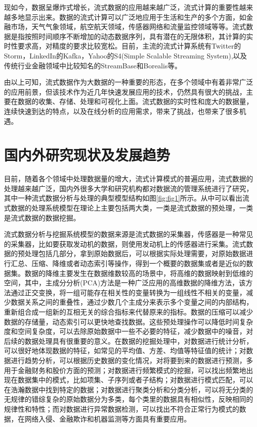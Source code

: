 现如今，数据呈爆炸式增长，流式数据的应用越来越广泛，流式计算的重要性越来越多地显示出来。数据的流式计算可以广泛地应用于生活和生产的多个方面，如金融市场，天气气象领域，航空航天领域，传感器网络和流量监控领域等等。流式数据是指按照时间顺序不断增加的动态数据序列，具有潜在的无限体积，其计算的实时性要求高，对精度的要求比较宽松。目前，主流的流式计算系统有Twitter的Storm，LinkedIn的Kafka，Yahoo的S4(Simple Scalable Streaming System),以及传统行业金融领域中比较知名的StreamBase和Borealis等。

由以上可知，流式数据作为大数据的一种重要的形态，在多个领域中有着非常广泛的应用前景，但该技术作为近几年快速发展应用的技术，仍然具有很大的挑战，主要在数据的收集、存储、处理和可视化上面。流式数据的实时性和庞大的数据量，连续快速到达的特点，以及在线分析的应用需求，带来了挑战，也带来了很多机遇。

\section{国内外研究现状及发展趋势}
目前，随着各个领域中处理数据量的增大，流式计算模式的普遍应用，流式数据的处理越来越广泛，国内外很多大学和研究机构都对数据流的管理系统进行了研究，其中一种流式数据分析与处理的典型模型结构如图\ref{fig:fig1}所示。从中可以看出流式数据的处理系统模型在理论上主要包括两大类，一类是流式数据的预处理，一类是流式数据的数据挖掘。

流式数据分析与挖掘系统模型的数据来源是流式数据的采集器，传感器是一种常见的采集器，比如要获取发动机的数据，则使用发动机上的传感器进行采集。流式数据的预处理包括几部分，拿到原始数据后，可以根据实际处理需要，对原始数据进行汇总、压缩、降维或者动态索引等操作，得到一个概要的数据集或者是近似的数据集。数据的降维主要发生在数据维数较高的场景中，将高维的数据映射到低维的空间，其中，主成分分析(PCA)方法是一种广泛应用的高维数据的降维方法，该方法通过正交变换，将一组可能存在相关性的变量转换为一组线性不相关的变量，减少数据关系之间的重叠性，通过少数几个主成分来表示多个变量之间的内部结构，重新组合成一组新的互相无关的综合指标来代替原来的指标。数据的压缩可以减少数据的存储量，动态索引可以更快地查找数据。这些预处理操作可以降低时间复杂度和空间复杂度，可以去除原始数据中一些不必要的特征，减少数据中的噪音，对后续的数据处理具有很重要的意义。在数据的挖掘处理中，对数据进行统计分析，可以很好地体现数据的特征，如常见的平均值、方差、均值等特征值的统计；对数据进行趋势分析，可以根据历史数据的变化情况，对将要到来的数据进行预测，多用于金融财务和股价方面的预测；对数据进行频繁模式的挖掘，可以找出频繁地出现在数据集中的模式，比如项集、子序列或者子结构；对数据进行模式匹配，可以在浩瀚数据中找到特定的数据；对数据进行聚类分析和分类分析，可以将无分类的无规律的错综复杂的原始数据分为多类，每个类里的数据具有相似性，反映相同的规律性和特性；而对数据进行异常数据检测，可以找出不符合正常行为模式的数据，在网络入侵、金融欺诈和机器监测等方面具有重要应用。

